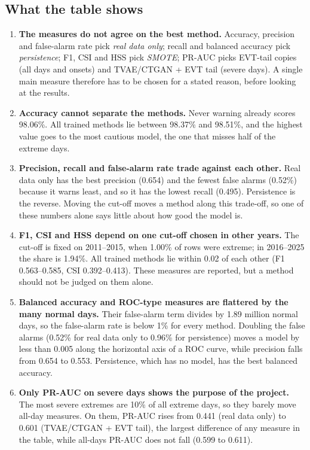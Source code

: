 \documentclass[12pt,a4paper]{report}
\begin{document}
\subsection{What the table shows}
\begin{enumerate}
\item \textbf{The measures do not agree on the best method.} Accuracy, precision and false-alarm rate pick
\emph{real data only}; recall and balanced accuracy pick \emph{persistence}; F1, CSI and HSS pick \emph{SMOTE}; PR-AUC
picks EVT-tail copies (all days and onsets) and TVAE/CTGAN + EVT tail (severe days). A single main measure therefore has
to be chosen for a stated reason, before looking at the results.
\item \textbf{Accuracy cannot separate the methods.} Never warning already scores 98.06\%. All trained methods lie
between 98.37\% and 98.51\%, and the highest value goes to the most cautious model, the one that misses half of the
extreme days.
\item \textbf{Precision, recall and false-alarm rate trade against each other.} Real data only has the best precision
(0.654) and the fewest false alarms (0.52\%) because it warns least, and so it has the lowest recall (0.495).
Persistence is the reverse. Moving the cut-off moves a method along this trade-off, so one of these numbers alone says
little about how good the model is.
\item \textbf{F1, CSI and HSS depend on one cut-off chosen in other years.} The cut-off is fixed on 2011--2015, when
1.00\% of rows were extreme; in 2016--2025 the share is 1.94\%. All trained methods lie within 0.02 of each other
(F1 0.563--0.585, CSI 0.392--0.413). These
measures are reported, but a method should not be judged on them alone.
\item \textbf{Balanced accuracy and ROC-type measures are flattered by the many normal days.} Their false-alarm term
divides by 1.89 million normal days, so the false-alarm rate is below 1\% for every method. Doubling the false alarms
(0.52\% for real data only to 0.96\% for persistence) moves a model by less than 0.005 along the horizontal axis of a
ROC curve, while precision falls from 0.654 to 0.553. Persistence, which has no model, has the best balanced
accuracy.
\item \textbf{Only PR-AUC on severe days shows the purpose of the project.} The most severe extremes are 10\% of all
extreme days, so they barely move all-day measures. On them, PR-AUC rises from 0.441 (real data only) to 0.601
(TVAE/CTGAN + EVT tail), the largest difference of any measure in the table, while all-days PR-AUC does not fall
(0.599 to 0.611).
\end{enumerate}
\end{document}
